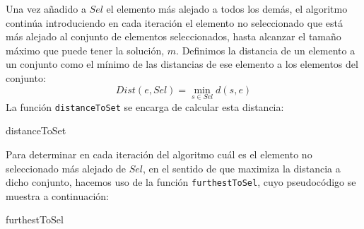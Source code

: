 \documentclass[11pt,a4paper]{article}
\begin{document}
	Una vez añadido a $Sel$ el elemento más alejado a todos los demás, el algoritmo continúa introduciendo en cada iteración el elemento no seleccionado que está más alejado al conjunto de elementos seleccionados, hasta alcanzar el tamaño máximo que puede tener la solución, $m$. Definimos la distancia de un elemento a un conjunto como el mínimo de las distancias de ese elemento a los elementos del conjunto:
	$$ Dist(e,Sel)=\min_{s \in Sel} d(s,e) $$
	La función \lstinline|distanceToSet| se encarga de calcular esta distancia:
	
		\begin{algorithm}[H]
		\caption{\sc distanceToSet}
		\end{algorithm}
	 
	 Para determinar en cada iteración del algoritmo cuál es el elemento no seleccionado más alejado de $Sel$, en el sentido de que maximiza la distancia a dicho conjunto, hacemos uso de la función \lstinline|furthestToSel|, cuyo pseudocódigo se muestra a continuación:
 
\begin{algorithm}[H]
	\caption{\sc furthestToSel}
\end{algorithm}
\end{document}

